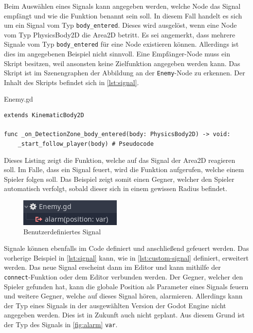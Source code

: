 Beim Auswählen eines Signals kann angegeben werden, welche Node das Signal empfängt und wie die Funktion benannt sein soll. In diesem Fall handelt es sich um ein Signal vom Typ \texttt{body\_entered}. Dieses wird ausgelöst, wenn eine Node vom Typ PhysicsBody2D die Area2D betritt. Es sei angemerkt, dass mehrere Signale vom Typ \texttt{body\_entered} für eine Node existieren können. Allerdings ist dies im angegebenen Beispiel nicht sinnvoll. Eine Empfänger-Node muss ein Skript besitzen, weil ansonsten keine Zielfunktion angegeben werden kann. Das Skript ist im Szenengraphen der Abbildung an der \texttt{Enemy}-Node zu erkennen. Der Inhalt des Skripts befindet sich in \autoref{lst:signal}.\\

\begin{listing}[H]
\caption{Enemy.gd}
\label{lst:signal}
\begin{verbatim}
extends KinematicBody2D

func _on_DetectionZone_body_entered(body: PhysicsBody2D) -> void:
	_start_follow_player(body) # Pseudocode
\end{verbatim}
\end{listing}

Dieses Listing zeigt die Funktion, welche auf das Signal der Area2D reagieren soll. Im Falle, dass ein Signal feuert, wird die Funktion aufgerufen, welche einem Spieler folgen soll.
Das Beispiel zeigt somit einen Gegner, welcher den Spieler automatisch verfolgt, sobald dieser sich in einem gewissen Radius befindet.\\

\begin{figure}[H]
\centering
\includegraphics[width=0.4\columnwidth]{figures/screenshots/custom-signal.png}
\caption{\label{fig:alarm} Benutzerdefiniertes Signal}
\end{figure}

Signale können ebenfalls im Code definiert und anschließend gefeuert werden. Das vorherige Beispiel in \autoref{lst:signal} kann, wie in \autoref{lst:custom-signal} definiert, erweitert werden. Das neue Signal erscheint dann im Editor und kann mithilfe der \texttt{connect}-Funktion oder dem Editor verbunden werden. Der Gegner, welcher den Spieler gefunden hat, kann die globale Position als Parameter eines Signals feuern und weitere Gegner, welche auf dieses Signal hören, alarmieren. Allerdings kann der Typ eines Signals in der ausgewählten Version der Godot Engine nicht angegeben werden. Dies ist in Zukunft auch nicht geplant\cite{godot-signal-type}. Aus diesem Grund ist der Typ des Signals in \autoref{fig:alarm} \texttt{var}.\\

